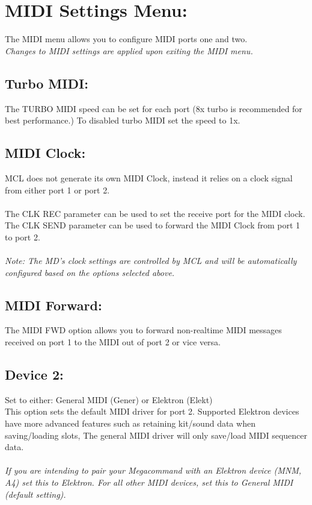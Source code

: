 \chapter{MIDI Settings Menu:}
The MIDI menu allows you to configure MIDI ports one and two.
\\
\textit{Changes to MIDI settings are applied upon exiting the MIDI menu.}

\section{Turbo MIDI:}
The TURBO MIDI speed can be set for each port (8x turbo is recommended for best performance.) To disabled turbo MIDI set the speed to 1x.
\section{MIDI Clock:}
MCL does not generate its own MIDI Clock, instead it relies on a clock signal from either port 1 or port 2.\\\\
The CLK REC parameter can be used to set the receive port for the MIDI clock.\\
The CLK SEND parameter can be used to forward the MIDI Clock from port 1 to port 2.\\\\
\textit{Note: The MD's clock settings are controlled by MCL and will be automatically configured based on the options selected above.}

\section{MIDI Forward:}
The MIDI FWD option allows you to forward non-realtime MIDI messages received on port 1 to the MIDI out of port 2 or vice versa.
\section{Device 2: }
Set to either: General MIDI (Gener) or Elektron (Elekt)\\

This option sets the default MIDI driver for port 2. Supported Elektron devices have
more advanced features such as retaining kit/sound data when saving/loading slots,
The general MIDI driver will only save/load MIDI sequencer data.\\
\\
\textit{If you are intending to pair your Megacommand with an Elektron device
(MNM, A4) set this to Elektron. For all other MIDI devices, set this to General MIDI (default setting).}